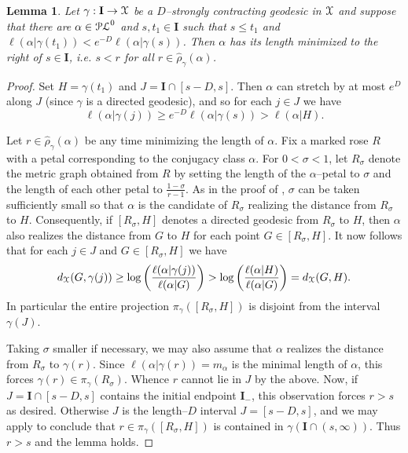 \documentclass[letterpaper,fleqn]{article}
\theoremstyle{plain}
\newtheorem{lemma}[theorem]{Lemma}
\theoremstyle{definition}
\newcommand{\pl}{{\EuScript{PL}}} %
\newcommand{\os}{{\EuScript X}} %
\newcommand{\X}{\os}
\newcommand{\len}{\ell}  %
\newcommand{\cp}{\pi} %
\newcommand{\minlen}{m}  %
\newcommand{\minpts}{\rho} %
\newcommand{\mintime}{\hat{\minpts}} %
\newcommand{\I}{\mathbf{I}}
\newcommand{\Imin}{\I_-}
\begin{document}
\begin{lemma} \label{prop:local}
Let $\gamma: \I \to \X$ be a $D$--strongly contracting geodesic in $\X$ and suppose that there are $\alpha \in \pl^0$ and $s,t_1 \in \I$ such that $s \le t_1$ and $\ell(\alpha|\gamma(t_1)) < e^{-D}\ell(\alpha|\gamma(s))$. Then $\alpha$ has its length minimized to the right of $s \in \I$, i.e. $s < r$ for all $r\in \mintime_\gamma (\alpha)$.
\end{lemma}
\begin{proof}
Set $H = \gamma(t_1)$ and $J = \I \cap [s-D,s]$. 
Then $\alpha$ can stretch by at most $e^D$ along $J$ (since $\gamma$ is a directed geodesic), and so for each $j\in J$ we have
\[\len(\alpha\vert\gamma(j)) \ge e^{-D}\len(\alpha\vert \gamma(s)) > \len(\alpha\vert H).\]

Let $r\in \mintime_\gamma(\alpha)$ be any time minimizing the length of $\alpha$. Fix a marked rose $R$ with a petal corresponding to the conjugacy class $\alpha$. For $0 < \sigma < 1$, let $R_\sigma$ denote the metric graph obtained from $R$ by setting the length of the $\alpha$--petal to $\sigma$ and the length of each other petal to $\frac{1-\sigma}{r-1}$. As in the proof of , $\sigma$ can be taken sufficiently small so that $\alpha$ is the candidate of $R_\sigma$ realizing the distance from $R_\sigma$ to $H$. Consequently, if $[R_\sigma,H]$ denotes a directed geodesic from $R_\sigma$ to $H$, then $\alpha$ also realizes the distance from $G$ to $H$ for each point $G\in [R_\sigma,H]$. It now follows that for each $j\in J$ and $G\in [R_\sigma,H]$ we have
\[d_\os(G,\gamma(j)) \ge \log\left(\frac{\len(\alpha\vert \gamma(j))}{\len(\alpha\vert G)}\right) > \log\left(\frac{\len(\alpha\vert H)}{\len(\alpha\vert G)}\right) = d_\os(G,H).\]
In particular the entire projection $\cp_\gamma([R_\sigma,H])$ is disjoint from the interval $\gamma(J)$. 

Taking $\sigma$ smaller if necessary, we may also assume that $\alpha$ realizes the distance from $R_\sigma$ to $\gamma(r)$. Since $\len(\alpha\vert\gamma(r)) = \minlen_\alpha$ is the minimal length of $\alpha$, this forces $\gamma(r)\in\cp_\gamma(R_\sigma)$. Whence $r$ cannot lie in $J$ by the above. Now, if $J = \I\cap[s-D,s]$ contains the initial endpoint $\Imin$, this observation forces $r > s$ as desired. Otherwise $J$ is the length--$D$ interval $J= [s-D,s]$, and we may apply  to conclude that $r\in \cp_\gamma([R_\sigma,H])$ is contained in $\gamma(\I\cap (s,\infty))$. Thus $r > s$ and the lemma holds.
\end{proof}
\end{document}
